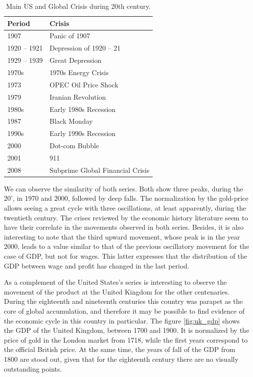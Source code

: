 \documentclass[a4paper,10cpi]{article}
\begin{document}
	
	\begin{table}[ht]
		\centering
		\begin{tabular}{ll}
			\hline
			Period & Crisis \\ 
			\hline
			1907 & Panic of 1907 \\ 
			1920 – 1921 & Depression of 1920 – 21 \\ 
			1929 – 1939 & Great Depression \\ 
			1970s & 1970s Energy Crisis \\ 
			1973 & OPEC Oil Price Shock \\ 
			1979 & Iranian Revolution\\ 
			1980s & Early 1980s Recession\\ 
			1987 & Black Monday \\ 
			1990s & Early 1990s Recession\\ 
			2000 & Dot-com Bubble \\ 
			2001 & 911 \\ 
			2008 & Subprime Global Financial Crisis \\ 
			\hline
		\end{tabular}
		\caption{Main US and Global Crisis during 20th century.}
		\label{tabla_crisis}
	\end{table}
	
	We can observe the similarity of both series. Both show three peaks, during the 20', in 1970 and 2000, followed by deep falls. The normalization by the gold-price allows seeing a great cycle with three oscillations, at least apparently, during the twentieth century. The crises reviewed by the economic history literature seem to have their correlate in the movements observed in both series. Besides, it is also interesting to note that the third upward movement, whose peak is in the year 2000, leads to a value similar to that of the previous oscillatory movement for the case of GDP, but not for wages. This latter expresses that the distribution of the GDP between wage and profit has changed in the last period.
	
	As a complement of the United States's series is interesting to observe the movement of the product at the United Kingdom for the other centenaries. During the eighteenth and nineteenth centuries this country was parapet as the core of global accumulation, and therefore it may be possible to find evidence of the economic cycle in this country in particular. The figure \ref{fig:uk_gdp} shows the GDP of the United Kingdom, between 1700 and 1900. It is normalized by the price of gold in the London market from 1718, while the first years correspond to the official British price. At the same time, the years of fall of the GDP from 1800 are stood out, given that for the eighteenth century there are no visually outstanding points.
	
\end{document}
